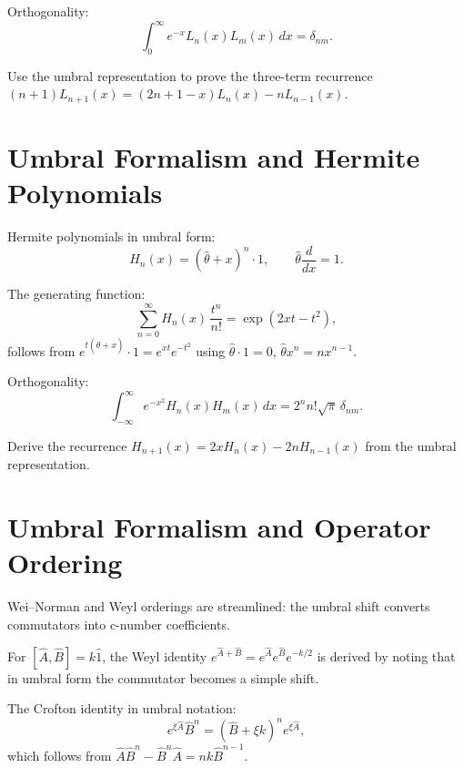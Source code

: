 Orthogonality:
\begin{equation}
\int_0^\infty e^{-x}L_n(x)L_m(x)\,dx = \delta_{nm}.
\label{eq:9.4.3}
\end{equation}

\begin{exercise}
Use the umbral representation to prove the three-term recurrence
$(n+1)L_{n+1}(x)=(2n+1-x)L_n(x)-nL_{n-1}(x)$.
\end{exercise}

\section{Umbral Formalism and Hermite Polynomials}

Hermite polynomials in umbral form:
\begin{equation}
H_n(x) = (\hat\theta+x)^n\cdot 1,
\qquad \hat\theta\frac{d}{dx}=1.
\label{eq:9.5.1}
\end{equation}

The generating function:
\begin{equation}
\sum_{n=0}^\infty H_n(x)\,\frac{t^n}{n!}
= \exp(2xt-t^2),
\label{eq:9.5.2}
\end{equation}
follows from $e^{t(\hat\theta+x)}\cdot1=e^{xt}e^{-t^2}$
using $\hat\theta\cdot1=0$, $\hat\theta x^n=nx^{n-1}$.

Orthogonality:
\begin{equation}
\int_{-\infty}^{\infty} e^{-x^2}H_n(x)H_m(x)\,dx
= 2^n n!\sqrt{\pi}\,\delta_{nm}.
\label{eq:9.5.3}
\end{equation}

\begin{exercise}
Derive the recurrence $H_{n+1}(x)=2xH_n(x)-2nH_{n-1}(x)$ from the
umbral representation.
\end{exercise}

\section{Umbral Formalism and Operator Ordering}

Wei--Norman and Weyl orderings are streamlined: the umbral shift converts
commutators into c-number coefficients.

For $[\hat A,\hat B]=k\hat 1$, the Weyl identity
$e^{\hat A+\hat B}=e^{\hat A}e^{\hat B}e^{-k/2}$
is derived by noting that in umbral form the commutator becomes a
simple shift.

The Crofton identity in umbral notation:
\begin{equation}
e^{\xi\hat A}\hat B^n = (\hat B+\xi k)^n e^{\xi\hat A},
\label{eq:9.6.1}
\end{equation}
which follows from $\hat A\hat B^n - \hat B^n\hat A = nk\hat B^{n-1}$.

